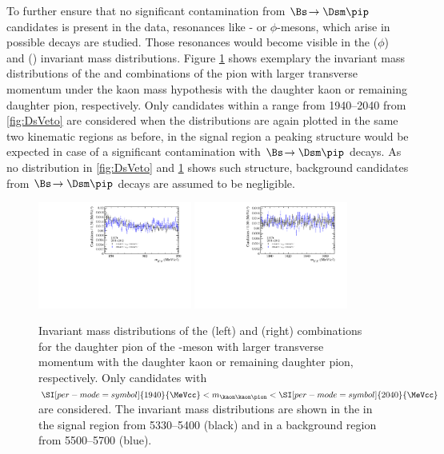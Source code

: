 To further ensure that no significant contamination from $\Bs\!\to\Dsm\pip$ candidates is present in the data, resonances like \Kstarz- or $\phi$-mesons, which arise in possible \Dsm decays are studied.
Those resonances would become visible in the \kaon\kaon ($\phi$) and \kaon\pion (\Kstarz) invariant mass distributions.
Figure \ref{fig:phi_Kst_veto} shows exemplary the invariant mass distributions of the \kaon\kaon and \kaon\pion combinations of the pion with larger transverse momentum under the kaon mass hypothesis with the daughter kaon or remaining daughter pion, respectively.
Only candidates within a range from \SIrange[per-mode=symbol]{1940}{2040}{\MeVcc} from \cref{fig:DsVeto} are considered when the distributions are again plotted in the same two kinematic regions as before, \ie in the signal region a peaking structure would be expected in case of a significant contamination with $\Bs\!\to\Dsm\pip$ decays.
As no distribution in \cref{fig:DsVeto} and \cref{fig:phi_Kst_veto} shows such structure, background candidates from $\Bs\!\to\Dsm\pip$ decays are assumed to be negligible.
\begin{figure}[tbp]
    \centering
    \includegraphics[width=0.45\textwidth]{06selection/figs/KstarHypo2.pdf}
    \includegraphics[width=0.45\textwidth]{06selection/figs/PhiHypo2.pdf}
    \caption{Invariant mass distributions of the \kaon\pion (left) and \kaon\kaon (right) combinations for the daughter pion of the \Dm-meson with larger transverse momentum with the daughter kaon or remaining daughter pion, respectively.
    Only candidates with $\SI[per-mode=symbol]{1940}{\MeVcc}<m_{\kaon\kaon\pion}<\SI[per-mode=symbol]{2040}{\MeVcc}$ are considered.
    The invariant mass distributions are shown in the in the \Bs signal region from \SIrange[per-mode=symbol]{5330}{5400}{\MeVcc} (black) and in a background region from \SIrange[per-mode=symbol]{5500}{5700}{\MeVcc} (blue).}
    \label{fig:phi_Kst_veto}
\end{figure}

